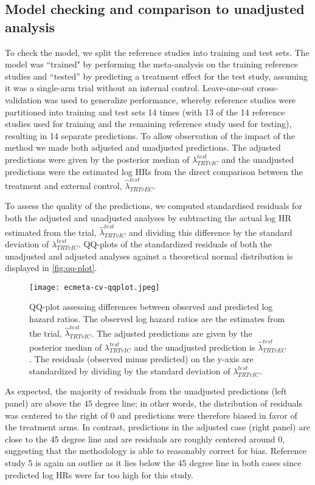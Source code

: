 \documentclass[11pt,final,fleqn]{article}\usepackage[]{graphicx}\usepackage[]{color}
\begin{document}
\subsection{Model checking and comparison to unadjusted analysis}
To check the model, we split the reference studies into training and test sets. The model was ``trained" by performing the meta-analysis on the training reference studies and ``tested''  by predicting a treatment effect for the test study, assuming it was a single-arm trial without an internal control. Leave-one-out cross-validation was used to generalize performance, whereby reference studies were partitioned into training and test sets 14 times (with 13 of the 14 reference studies used for training and the remaining reference study used for testing), resulting in 14 separate predictions. To allow observation of the impact of the method we made both adjusted and unadjusted predictions. The adjusted predictions were given by the posterior median of  $ \lambda^{test}_{\textit{TRT}vIC}$ and the unadjusted predictions were the estimated log HRs from the direct comparison between the treatment and external control, $\hat{\lambda}^{test}_{\textit{TRT}vEC}$.

To assess the quality of the predictions, we computed standardised residuals for both the adjusted and unadjusted analyses by subtracting the actual log HR estimated from the trial, $\hat{\lambda}^{test}_{\textit{TRT}vIC}$ and dividing this difference by the standard deviation of $ \lambda^{test}_{\textit{TRT}vIC}$. QQ-plots of the standardized residuals of both the unadjusted and adjusted analyses against a theoretical normal distribution is displayed in \autoref{fig:qq-plot}.

\begin{figure}[h]
\centering
\texttt{[image: ecmeta-cv-qqplot.jpeg]} 
\caption{QQ-plot assessing differences between observed and predicted log hazard ratios. The observed log hazard ratios are the estimates from the trial, $\hat{\lambda}^{test}_{\textit{TRT}vIC}$. The adjusted predictions are given by the posterior median of  $ \lambda^{test}_{\textit{TRT}vIC}$  and the unadjusted prediction is $\hat{\lambda}^{test}_{\textit{TRT}vEC}$. The residuals (observed minus predicted) on the y-axis are standardized by dividing by the standard deviation of $ \lambda^{test}_{\textit{TRT}vIC}$. }
\label{fig:qq-plot}
\end{figure}

As expected, the majority of residuals from the unadjusted predictions (left panel) are above the 45 degree line; in other words, the distribution of residuals was centered to the right of $0$ and predictions were therefore biased in favor of the treatment arms. In contrast, predictions in the adjusted case (right panel) are close to the 45 degree line and are residuals are roughly centered around 0, suggesting that the methodology is able to reasonably correct for bias. Reference study 5 is again an outlier as it lies below the 45 degree line in both cases since predicted log HRs were far too high for this study.
\end{document}
